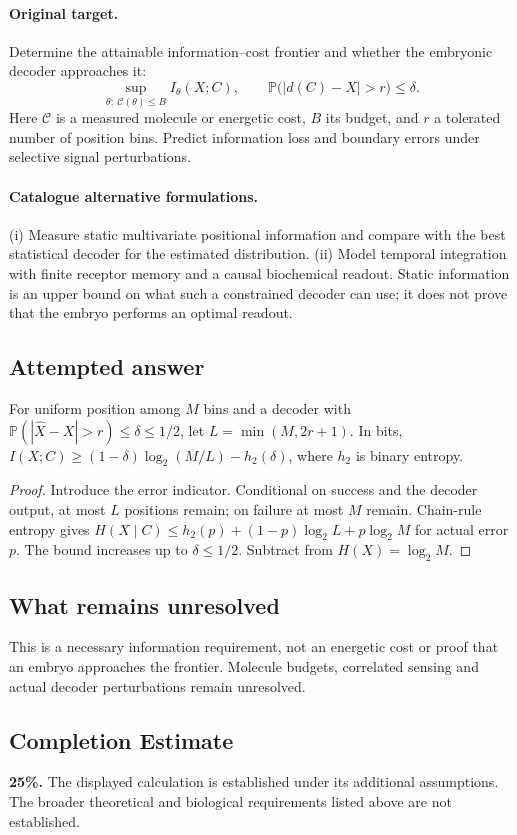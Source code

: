 \documentclass[11pt]{article}
\begin{document}
\paragraph{Original target.}
Determine the attainable information--cost frontier and whether the embryonic decoder approaches it:
\[
\sup_{\theta:\ \mathcal C(\theta)\leq B} I_\theta(X;C),\qquad
\mathbb{P}\bigl(|d(C)-X|>r\bigr)\leq\delta.
\]
Here $\mathcal C$ is a measured molecule or energetic cost, $B$ its budget, and $r$ a tolerated number of position bins. Predict information loss and boundary errors under selective signal perturbations.
\paragraph{Catalogue alternative formulations.}
(i) Measure static multivariate positional information and compare with the best statistical decoder for the estimated distribution. (ii) Model temporal integration with finite receptor memory and a causal biochemical readout. Static information is an upper bound on what such a constrained decoder can use; it does not prove that the embryo performs an optimal readout.
\subsection{Attempted answer}
\begin{proposition}
For uniform position among $M$ bins and a decoder with $\mathbb{P}(|\widehat X-X|>r)\leq\delta\leq1/2$, let $L=\min(M,2r+1)$. In bits, $I(X;C)\geq(1-\delta)\log_2(M/L)-h_2(\delta)$, where $h_2$ is binary entropy.
\end{proposition}
\begin{proof}
Introduce the error indicator. Conditional on success and the decoder output, at most $L$ positions remain; on failure at most $M$ remain. Chain-rule entropy gives $H(X\mid C)\leq h_2(p)+(1-p)\log_2L+p\log_2M$ for actual error $p$. The bound increases up to $\delta\leq1/2$. Subtract from $H(X)=\log_2M$.
\end{proof}
\subsection{What remains unresolved}
This is a necessary information requirement, not an energetic cost or proof that an embryo approaches the frontier. Molecule budgets, correlated sensing and actual decoder perturbations remain unresolved.
\subsection{Completion Estimate}
\textbf{25\%.} The displayed calculation is established under its additional assumptions. The broader theoretical and biological requirements listed above are not established.
\end{document}
